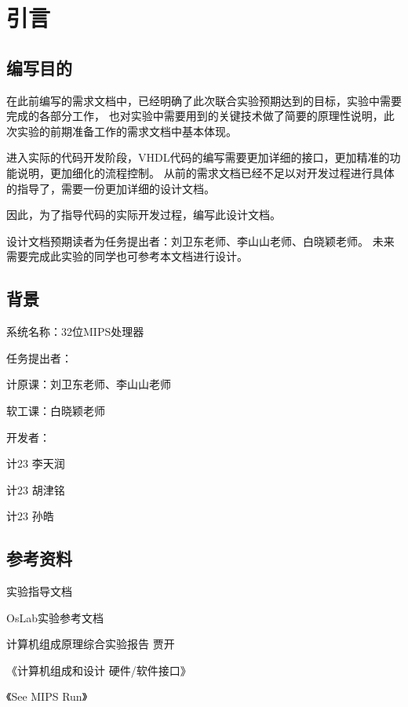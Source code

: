 \section{引言}
    \subsection{编写目的}
        在此前编写的需求文档中，已经明确了此次联合实验预期达到的目标，实验中需要完成的各部分工作，
        也对实验中需要用到的关键技术做了简要的原理性说明，此次实验的前期准备工作的需求文档中基本体现。

        进入实际的代码开发阶段，VHDL代码的编写需要更加详细的接口，更加精准的功能说明，更加细化的流程控制。
        从前的需求文档已经不足以对开发过程进行具体的指导了，需要一份更加详细的设计文档。

        因此，为了指导代码的实际开发过程，编写此设计文档。

        设计文档预期读者为任务提出者：刘卫东老师、李山山老师、白晓颖老师。
        未来需要完成此实验的同学也可参考本文档进行设计。

    \subsection{背景}
        系统名称：32位MIPS处理器

        任务提出者：
        \begin{minipage}[t]{0.5\linewidth}
        计原课：刘卫东老师、李山山老师

        软工课：白晓颖老师
        \end{minipage}
        

        开发者：
        \begin{minipage}[t]{0.5\linewidth}
        计23 李天润

        计23 胡津铭

        计23 孙皓
        \end{minipage}

    \subsection{参考资料}
        实验指导文档

        OsLab实验参考文档

        计算机组成原理综合实验报告 贾开

        《计算机组成和设计 硬件/软件接口》

        《See MIPS Run》


